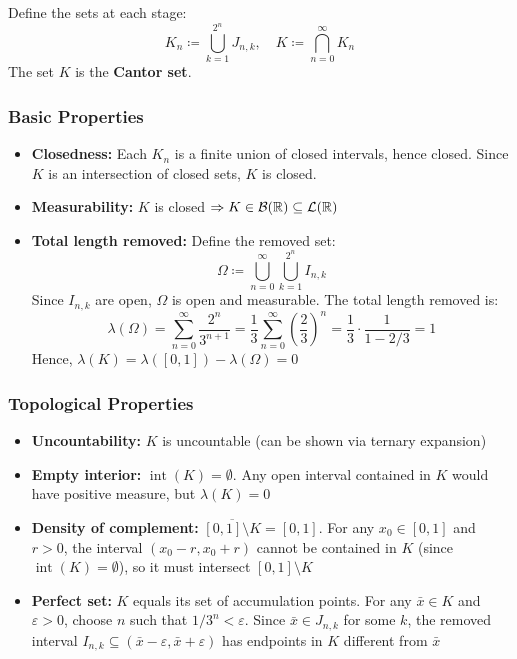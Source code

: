 Define the sets at each stage:
\[
K_n \coloneqq \bigcup_{k=1}^{2^n} J_{n,k}, \quad K \coloneqq \bigcap_{n=0}^{\infty} K_n
\]
The set $K$ is the \textbf{Cantor set}.

\subsubsection{Basic Properties}

\begin{itemize}
    \item \textbf{Closedness:} Each $K_n$ is a finite union of closed intervals, hence closed. Since $K$ is an intersection of closed sets, $K$ is closed.
    \item \textbf{Measurability:} $K$ is closed $\Rightarrow K \in \mathcal{B}(\mathbb{R}) \subseteq \mathcal{L}(\mathbb{R})$
    \item \textbf{Total length removed:} Define the removed set:
    \[
    \Omega \coloneqq \bigcup_{n=0}^{\infty} \bigcup_{k=1}^{2^n} I_{n,k}
    \]
    Since $I_{n,k}$ are open, $\Omega$ is open and measurable. The total length removed is:
    \[
    \lambda(\Omega) = \sum_{n=0}^{\infty} \frac{2^n}{3^{n+1}} = \frac{1}{3} \sum_{n=0}^{\infty} \left( \frac{2}{3} \right)^n = \frac{1}{3} \cdot \frac{1}{1 - 2/3} = 1
    \]
    Hence, $\lambda(K) = \lambda([0,1]) - \lambda(\Omega) = 0$
\end{itemize}

\subsubsection{Topological Properties}

\begin{itemize}
    \item \textbf{Uncountability:} $K$ is uncountable (can be shown via ternary expansion)
    \item \textbf{Empty interior:} $\operatorname{int}(K) = \emptyset$. Any open interval contained in $K$ would have positive measure, but $\lambda(K) = 0$
    \item \textbf{Density of complement:} $\overline{[0,1] \setminus K} = [0,1]$. For any $x_0 \in [0,1]$ and $r > 0$, the interval $(x_0 - r, x_0 + r)$ cannot be contained in $K$ (since $\operatorname{int}(K) = \emptyset$), so it must intersect $[0,1] \setminus K$
    \item \textbf{Perfect set:} $K$ equals its set of accumulation points. For any $\bar{x} \in K$ and $\varepsilon > 0$, choose $n$ such that $1/3^n < \varepsilon$. Since $\bar{x} \in J_{n,k}$ for some $k$, the removed interval $I_{n,k} \subseteq (\bar{x} - \varepsilon, \bar{x} + \varepsilon)$ has endpoints in $K$ different from $\bar{x}$
\end{itemize}

